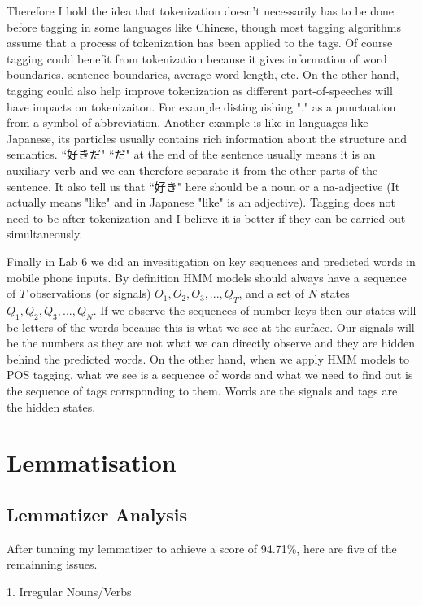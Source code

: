 \documentclass[11pt]{article} %
\begin{document}
Therefore I hold the idea that tokenization doesn't necessarily has to be done before tagging in some languages like Chinese, though most tagging algorithms assume that a process of tokenization has been applied to the tags\cite[157]{JurafskyMartin200805}. Of course tagging could benefit from tokenization because it gives information of word boundaries, sentence boundaries, average word length, etc. On the other hand, tagging could also help improve tokenization as different part-of-speeches will have impacts on tokenizaiton. For example distinguishing "." as a punctuation from a symbol of abbreviation. Another example is like in languages like Japanese, its particles usually contains rich information about the structure and semantics. ``好きだ" ``だ" at the end of the sentence usually means it is an auxiliary verb and we can therefore separate it from the other parts of the sentence. It also tell us that ``好き" here should be a noun or a na-adjective (It actually means "like" and in Japanese "like" is an adjective). Tagging does not need to be after tokenization and I believe it is better if they can be carried out simultaneously.

Finally in Lab 6 we did an invesitigation on key sequences and predicted words in mobile phone inputs. By definition HMM models should always have a sequence of $T$ observations (or signals) $O_1, O_2, O_3, ..., Q_T$, and a set of $N$ states $Q_1, Q_2, Q_3, ..., Q_N$\cite[177]{JurafskyMartin200805}. If we observe the sequences of number keys then our states will be letters of the words because this is what we see at the surface. Our signals will be the numbers as they are not what we can directly observe and they are hidden behind the predicted words. On the other hand, when we apply HMM models to POS tagging, what we see is a sequence of words and what we need to find out is the sequence of tags corrsponding to them. Words are the signals and tags are the hidden states.

\section{Lemmatisation}

\subsection{Lemmatizer Analysis}
After tunning my lemmatizer to achieve a score of 94.71\%, here are five of the remainning issues.

1. Irregular Nouns/Verbs
\end{document}
